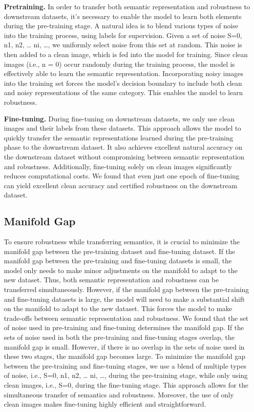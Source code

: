 \textbf{Pretraining.}
In order to transfer both semantic representation and robustness to downstream datasets, it's necessary to enable the model to learn both elements during the pre-training stage. A natural idea is to blend various types of noise into the training process, using labels for supervision.
Given a set of noise S={0, n1, n2, … ni, …}, we uniformly select noise from this set at random. This noise is then added to a clean image, which is fed into the model for training. Since clean images (i.e., n = 0) occur randomly during the training process, the model is effectively able to learn the semantic representation.
Incorporating noisy images into the training set forces the model's decision boundary to include both clean and noisy representations of the same category. This enables the model to learn robustness.

\textbf{Fine-tuning.}
During fine-tuning on downstream datasets, we only use clean images and their labels from these datasets. This approach allows the model to quickly transfer the semantic representations learned during the pre-training phase to the downstream dataset. It also achieves excellent natural accuracy on the downstream dataset without compromising between semantic representation and robustness. Additionally, fine-tuning solely on clean images significantly reduces computational costs. We found that even just one epoch of fine-tuning can yield excellent clean accuracy and certified robustness on the downstream dataset.

\subsection{Manifold Gap}
To ensure robustness while transferring semantics, it is crucial to minimize the manifold gap between the pre-training dataset and fine-tuning dataset.
If the manifold gap between the pre-training and fine-tuning datasets is small, the model only needs to make minor adjustments on the manifold to adapt to the new dataset. Thus, both semantic representation and robustness can be transferred simultaneously.
However, if the manifold gap between the pre-training and fine-tuning datasets is large, the model will need to make a substantial shift on the manifold to adapt to the new dataset. This forces the model to make trade-offs between semantic representation and robustness.
We found that the set of noise used in pre-training and fine-tuning determines the manifold gap. If the sets of noise used in both the pre-training and fine-tuning stages overlap, the manifold gap is small. However, if there is no overlap in the sets of noise used in these two stages, the manifold gap becomes large.
To minimize the manifold gap between the pre-training and fine-tuning stages, we use a blend of multiple types of noise, i.e., S={0, n1, n2, … ni, …}, during the pre-training stage, while only using clean images, i.e., S={0}, during the fine-tuning stage. This approach allows for the simultaneous transfer of semantics and robustness. Moreover, the use of only clean images makes fine-tuning highly efficient and straightforward.

